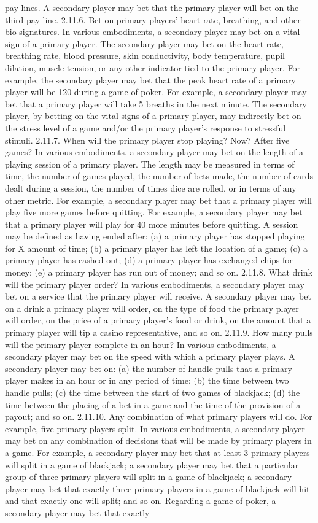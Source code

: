 \documentclass[11pt,a4paper]{article}
\begin{document}
pay-lines. A secondary player may bet that the primary player will bet on the third pay line. 2.11.6. Bet on primary players' heart rate, breathing, and other bio signatures. In various embodiments, a secondary player may bet on a vital sign of a primary player. The secondary player may bet on the heart rate, breathing rate, blood pressure, skin conductivity, body temperature, pupil dilation, muscle tension, or any other indicator tied to the primary player. For example, the secondary player may bet that the peak heart rate of a primary player will be 120 during a game of poker. For example, a secondary player may bet that a primary player will take 5 breaths in the next minute. The secondary player, by betting on the vital signs of a primary player, may indirectly bet on the stress level of a game and/or the primary player's response to stressful stimuli. 2.11.7. When will the primary player stop playing? Now? After five games? In various embodiments, a secondary player may bet on the length of a playing session of a primary player. The length may be measured in terms of time, the number of games played, the number of bets made, the number of cards dealt during a session, the number of times dice are rolled, or in terms of any other metric. For example, a secondary player may bet that a primary player will play five more games before quitting. For example, a secondary player may bet that a primary player will play for 40 more minutes before quitting. A session may be defined as having ended after: (a) a primary player has stopped playing for X amount of time; (b) a primary player has left the location of a game; (c) a primary player has cashed out; (d) a primary player has exchanged chips for money; (e) a primary player has run out of money; and so on. 2.11.8. What drink will the primary player order? In various embodiments, a secondary player may bet on a service that the primary player will receive. A secondary player may bet on a drink a primary player will order, on the type of food the primary player will order, on the price of a primary player's food or drink, on the amount that a primary player will tip a casino representative, and so on. 2.11.9. How many pulls will the primary player complete in an hour? In various embodiments, a secondary player may bet on the speed with which a primary player plays. A secondary player may bet on: (a) the number of handle pulls that a primary player makes in an hour or in any period of time; (b) the time between two handle pulls; (c) the time between the start of two games of blackjack; (d) the time between the placing of a bet in a game and the time of the provision of a payout; and so on. 2.11.10. Any combination of what primary players will do. For example, five primary players split. In various embodiments, a secondary player may bet on any combination of decisions that will be made by primary players in a game. For example, a secondary player may bet that at least 3 primary players will split in a game of blackjack; a secondary player may bet that a particular group of three primary players will split in a game of blackjack; a secondary player may bet that exactly three primary players in a game of blackjack will hit and that exactly one will split; and so on. Regarding a game of poker, a secondary player may bet that exactly 
\end{document}
